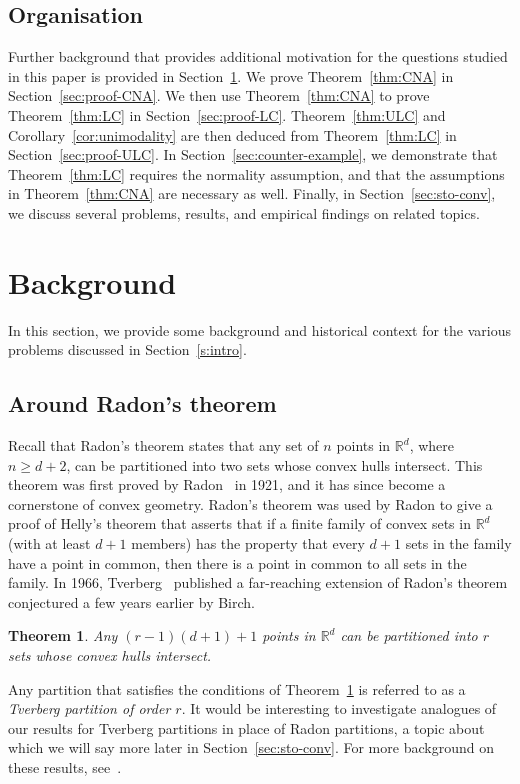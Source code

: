 \documentclass[12pt,english,reqno]{amsart}
\theoremstyle{plain}
\newtheorem{thm}{Theorem}[section]
\theoremstyle{remark}
\numberwithin{figure}{section}
\numberwithin{equation}{section}
\def\rr{\mathbb{R}}
\newcommand{\darkblue}{\color{darkblue}}
\newcommand{\defnb}[1]{\emph{\darkblue #1}}
\begin{document}
\subsection*{Organisation}
Further background that provides additional motivation for the questions studied in this paper is provided in Section~\ref{sec:background}. We prove Theorem~\ref{thm:CNA} in Section~\ref{sec:proof-CNA}. We then use Theorem~\ref{thm:CNA} to prove Theorem~\ref{thm:LC} in Section~\ref{sec:proof-LC}. Theorem~\ref{thm:ULC} and Corollary~\ref{cor:unimodality} are then deduced from Theorem~\ref{thm:LC} in Section~\ref{sec:proof-ULC}. In Section~\ref{sec:counter-example}, we demonstrate that Theorem~\ref{thm:LC} requires the normality assumption, and that the assumptions in Theorem~\ref{thm:CNA} are necessary as well. Finally, in Section~\ref{sec:sto-conv}, we discuss several problems, results, and empirical findings on related topics.

\section{Background}\label{sec:background}

In this section, we provide some background and historical context for the various problems discussed in Section~\ref{s:intro}.

\subsection*{Around Radon's theorem}
Recall that Radon's theorem states that any set of $n$ points in $\rr^{d}$, where $n\ge d+2$, can be partitioned into two sets whose convex hulls intersect. This theorem was first proved by Radon~\citep{Rad} in 1921, and it has since become a cornerstone of convex geometry. Radon's theorem was used by Radon to give a proof of Helly's theorem that asserts that if a finite family of convex sets in $\rr^{d}$ (with at least $d+1$ members) has the property that every $d+1$ sets in the family have a point in common, then there is a point in common to all sets in the family. In 1966, Tverberg~\citep{Tve66} published a far-reaching extension of Radon's theorem conjectured a few years earlier by Birch.

\begin{thm}\label {thm:Tve}
	Any $(r-1)(d+1)+1$ points in $\mathbb R^d$ can be partitioned into $r$ sets whose convex hulls intersect.
\end{thm}
Any partition that satisfies the conditions of Theorem~\ref{thm:Tve} is referred to as a \defnb{Tverberg partition of order $r$}. It would be interesting to investigate analogues of our results for Tverberg partitions in place of Radon partitions, a topic about which we will say more later in Section~\ref{sec:sto-conv}. For more background on these results, see~\citep{Bar21,Eck79,Eck93,Rou01,BS18,BK22}.
\end{document}
